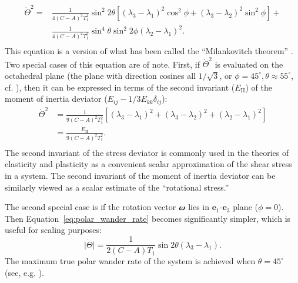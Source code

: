 \documentclass[preprint,12pt,authoryear]{elsarticle}
\newcommand{\mitbf}[1]{\hbox{\mathversion{bold}$#1$}}
\begin{document}
\begin{equation}
\begin{aligned}
\dot{\Theta}^2 = 
&\frac{1}{4(C-A)^2 T_1^2}\sin^2{2\theta} \left[( \lambda_3 - \lambda_1)^2 \cos^2{\phi} + (\lambda_3 - \lambda_2)^2 \sin^2{\phi} \right] +\\
&\frac{1}{4(C-A)^2 T_1^2}\sin^4{\theta} \sin^2{2\phi}\left( \lambda_2 - \lambda_1 \right)^2. \\
\label{eq:polar_wander_rate}
\end{aligned}
\end{equation}
This equation is a version of what has been called the ``Milankovitch theorem'' \citep{munk1960rotation}.
Two special cases of this equation are of note. First, if $\dot{\Theta}^2$ is evaluated on the octahedral plane
(the plane with direction cosines all $1/\sqrt{3}$, or $\phi=45^\circ, \theta\approx 55^\circ$, cf. \citet{fung1965foundations}), 
then it can be expressed in terms of the second invariant ($E_{\mathrm{II}}$) of the moment of inertia deviator 
($E_{ij} - 1/3 E_{kk} \delta_{ij}$):
\begin{equation}
\begin{aligned}
\dot{\Theta}^2
&= \frac{1}{9(C-A)^2 T_1^2}\left[( \lambda_3 - \lambda_1)^2 + (\lambda_3 - \lambda_2)^2 + (\lambda_2 - \lambda_1)^2 \right]\\
&= \frac{E_{\mathrm{II}}}{9(C-A)^2 T_1^2}. \\
\end{aligned}
\end{equation}
The second invariant of the stress deviator is commonly used in the theories of elasticity and plasticity
as a convenient scalar approximation of the shear stress in a system.
The second invariant of the moment of inertia deviator can be similarly viewed as a scalar estimate of the ``rotational stress.''

The second special case is if the rotation vector $\mitbf{\omega}$ lies in $\mathbf{e}_1$-$\mathbf{e}_3$ plane ($\phi = 0$).
Then Equation~\eqref{eq:polar_wander_rate} becomes significantly simpler, which is useful for scaling purposes:
\begin{equation}
\vert \dot{\Theta} \vert = 
\frac{1}{2(C-A) T_1}\sin{2\theta} ( \lambda_3 - \lambda_1).
\label{eq:simple_milankovitch}
\end{equation}
The maximum true polar wander rate of the system is achieved when $\theta=45^\circ$ (see, e.g. \citet{fung1965foundations}).
\end{document}

